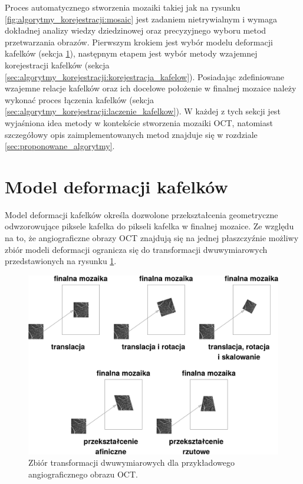 Proces automatycznego stworzenia mozaiki takiej jak na rysunku \ref{fig:algorytmy_korejestracji:mosaic} jest zadaniem nietrywialnym i wymaga dokładnej analizy wiedzy dziedzinowej oraz precyzyjnego wyboru metod przetwarzania obrazów. Pierwszym krokiem jest wybór modelu deformacji kafelków (sekcja \ref{sec:algorytmy_korejestracji:model_deformacji}), następnym etapem jest wybór metody wzajemnej korejestracji kafelków (sekcja \ref{sec:algorytmy_korejestracji:korejestracja_kafelow}). Posiadając zdefiniowane wzajemne relacje kafelków oraz ich docelowe położenie w finalnej mozaice należy wykonać proces łączenia kafelków (sekcja \ref{sec:algorytmy_korejestracji:laczenie_kafelkow}). W każdej z tych sekcji jest wyjaśniona idea metody w kontekście stworzenia mozaiki OCT, natomiast szczegółowy opis zaimplementowanych metod znajduje się w rozdziale \ref{sec:proponowane_algorytmy}.

\section{Model deformacji kafelków}
\label{sec:algorytmy_korejestracji:model_deformacji}

Model deformacji kafelków określa dozwolone przekształcenia geometryczne odwzorowujące piksele kafelka do pikseli kafelka w finalnej mozaice. Ze względu na to, że angiograficzne obrazy OCT znajdują się na jednej płaszczyźnie możliwy zbiór modeli deformacji ogranicza  się do transformacji dwuwymiarowych przedstawionych na rysunku \ref{fig:algorytmy_korejestracji:trans}.

\begin{figure}[H]
  \centering
  \includegraphics[width=\textwidth]{gfx/trans}
  \caption{Zbiór transformacji dwuwymiarowych dla przykładowego angiograficznego obrazu OCT.}
  \label{fig:algorytmy_korejestracji:trans}
\end{figure}

